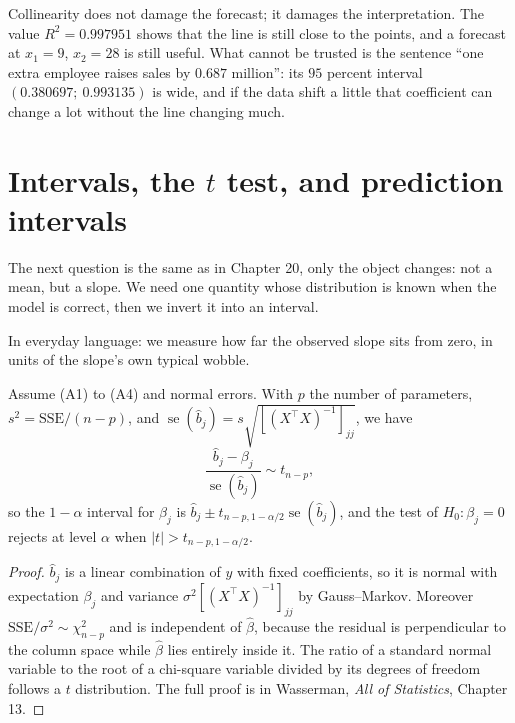 Collinearity does not damage the forecast; it damages the interpretation. The value
$R^2=0.997951$ shows that the line is still close to the points, and a forecast at $x_1=9$,
$x_2=28$ is still useful. What cannot be trusted is the sentence ``one extra employee raises
sales by $0.687$ million'': its $95$ percent interval $(0.380697;\ 0.993135)$ is wide, and if
the data shift a little that coefficient can change a lot without the line changing much.

\section{Intervals, the $t$ test, and prediction intervals}

The next question is the same as in Chapter 20, only the object changes: not a mean, but a
slope. We need one quantity whose distribution is known when the model is correct, then we
invert it into an interval.

In everyday language: we measure how far the observed slope sits from zero, in units of the
slope's own typical wobble.


\begin{teorema}
Assume (A1) to (A4) and normal errors. With $p$ the number of parameters,
$s^2=\mathrm{SSE}/(n-p)$, and $\operatorname{se}(\hat b_j)=s\sqrt{[(X^{\top}X)^{-1}]_{jj}}$,
we have
\[
\frac{\hat b_j-\beta_j}{\operatorname{se}(\hat b_j)}\sim t_{n-p},
\]
so the $1-\alpha$ interval for $\beta_j$ is
$\hat b_j\pm t_{n-p,1-\alpha/2}\operatorname{se}(\hat b_j)$, and the test of
$H_0\colon\beta_j=0$ rejects at level $\alpha$ when $|t|>t_{n-p,1-\alpha/2}$.
\end{teorema}

\begin{proof}[Proof]
$\hat b_j$ is a linear combination of $y$ with fixed coefficients, so it is normal with
expectation $\beta_j$ and variance $\sigma^2[(X^{\top}X)^{-1}]_{jj}$ by Gauss--Markov. Moreover
$\mathrm{SSE}/\sigma^2\sim\chi^2_{n-p}$ and is independent of $\hat\beta$, because the residual
is perpendicular to the column space while $\hat\beta$ lies entirely inside it. The ratio of a
standard normal variable to the root of a chi-square variable divided by its degrees of freedom
follows a $t$ distribution. The full proof is in Wasserman, \emph{All of Statistics},
Chapter 13.
\end{proof}

